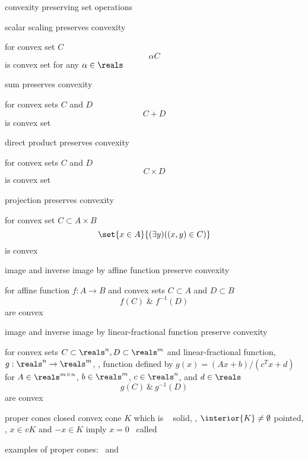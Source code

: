 \documentclass[17pt,landscape]{foils}
\begin{document}
{\begin{myproposition}{convexity preserving set operations}
	\item
		scalar scaling preserves convexity
		\bit
		\item
			for convex set $C$
			$$\alpha C$$ is convex set for any $\alpha\in\reals$
		\eit

	\item
		sum preserves convexity
		\bit
		\item
			for convex sets $C$ and $D$
			$$C+D$$ is convex set
		\eit

	\item
		direct product preserves convexity
		\bit
		\item
			for convex sets $C$ and $D$
			$$C\times D$$ is convex set
		\eit

	\item
		projection preserves convexity
		\bit
		\item
			for convex set $C\subset A \times B$
			$$
				\set{x\in A}{(\exists y)((x,y)\in C)}
			$$
			is convex
		\eit

	\item
		image and inverse image by affine function preserve convexity
		\bit
		\item
			for affine function $f:A\to B$ and convex sets $C\subset A$ and $D\subset B$
			$$
				f(C) \;\& \; f^{-1}(D)
			$$
			are convex
		\eit

	\item
		image and inverse image by linear-fractional function preserve convexity
		\bit
		\item
			for convex sets $C\subset \reals^n, D\subset \reals^m$
			and
			linear-fractional function, $g:\reals^n\to\reals^m$,
			\ie, function defined by $g(x) = (Ax+b)/(c^Tx+d)$
			for $A\in\reals^{m\times n}$, $b\in\reals^m$, $c\in\reals^n$, and $d\in\reals$
			$$
				g(C) \ \& \ g^{-1}(D)
			$$
			are convex
		\eit
	\eit
\end{myproposition}
\vfill



\begin{mydefinition}{proper cones}
	closed convex cone $K$ which is
	\shrinkspacewithintheoremslike\
	\ibit
	\iitem
		solid, \ie, $\interior{K}\neq \emptyset$
	\iitem
		pointed, \ie, $x\in vK$ and $-x\in K$ imply $x=0$
	\eit
	\shrinkspacewithintheoremslike\
	called 
\end{mydefinition}

\bit
\item
	examples of proper cones:
	\ and \
\eit

}
\end{document}
